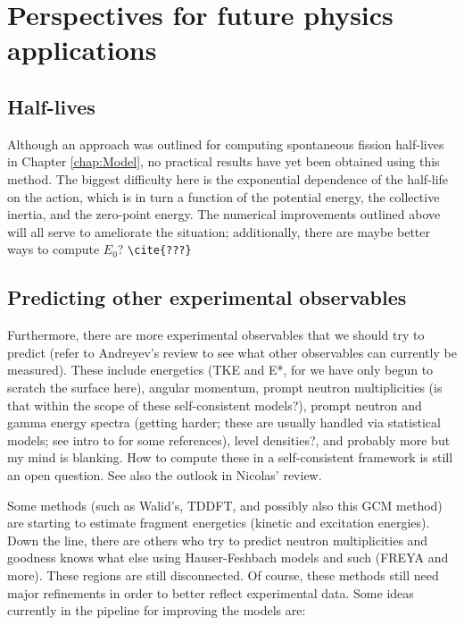 \section{Perspectives for future physics applications}

\subsection{Half-lives}

Although an approach was outlined for computing spontaneous fission half-lives in Chapter \ref{chap:Model}, no practical results have yet been obtained using this method. The biggest difficulty here is the exponential dependence of the half-life on the action, which is in turn a function of the potential energy, the collective inertia, and the zero-point energy. The numerical improvements outlined above will all serve to ameliorate the situation; additionally, there are maybe better ways to compute $E_0$? \verb|\cite{???}|

\subsection{Predicting other experimental observables}

Furthermore, there are more experimental observables that we should try to predict (refer to Andreyev's review to see what other observables can currently be measured). These include energetics (TKE and E*, for we have only begun to scratch the surface here), angular momentum, prompt neutron multiplicities (is that within the scope of these self-consistent models?), prompt neutron and gamma energy spectra (getting harder; these are usually handled via statistical models; see intro to \cite{Schmidt2018} for some references), level densities?, and probably more but my mind is blanking. How to compute these in a self-consistent framework is still an open question. See also the outlook in Nicolas' review.

Some methods (such as Walid's, TDDFT, and possibly also this GCM method) are starting to estimate fragment energetics (kinetic and excitation energies). Down the line, there are others who try to predict neutron multiplicities and goodness knows what else using Hauser-Feshbach models and such (FREYA and more). These regions are still disconnected. Of course, these methods still need major refinements in order to better reflect experimental data. Some ideas currently in the pipeline for improving the models are:

